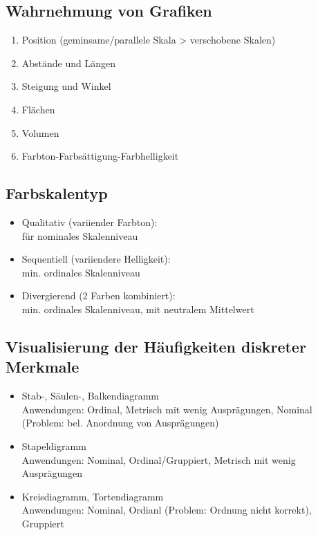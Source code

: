 \documentclass[10pt,a4paper,landscape]{article}
\begin{document}
\begin{multicols}{4}
\subsection{Wahrnehmung von Grafiken}
\begin{enumerate}
\item Position (geminsame/parallele Skala > verschobene Skalen)
\item Abstände und Längen 
\item Steigung und Winkel
\item Flächen
\item Volumen
\item Farbton-Farbsättigung-Farbhelligkeit 
\end{enumerate}

\subsection{Farbskalentyp}
\begin{itemize}
\item Qualitativ (variiender Farbton): \\
für nominales Skalenniveau

\item Sequentiell (variiendere Helligkeit): \\
min. ordinales Skalenniveau

\item Divergierend (2 Farben kombiniert): \\
min. ordinales Skalenniveau, mit neutralem Mittelwert
\end{itemize}

\subsection{Visualisierung der Häufigkeiten diskreter Merkmale}
\begin{itemize}
\item Stab-, Säulen-, Balkendiagramm \\
		Anwendungen: Ordinal, Metrisch mit wenig Ausprägungen, Nominal (Problem: bel. Anordnung von Ausprägungen)
\item Stapeldigramm \\
		Anwendungen: Nominal, Ordinal/Gruppiert, Metrisch mit wenig Ausprägungen
\item Kreisdiagramm, Tortendiagramm \\
		Anwendungen: Nominal, Ordianl (Problem: Ordnung nicht korrekt), Gruppiert
\end{itemize}


\end{multicols}
\end{document}
